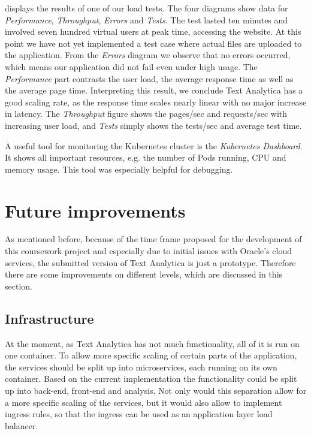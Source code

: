 \documentclass[conference]{IEEEtran}
\begin{document}
 displays the results of one of our load tests. The four diagrams show data for \textit{Performance}, \textit{Throughput}, \textit{Errors} and \textit{Tests}. The test lasted ten minutes and involved seven hundred virtual users at peak time, accessing the website. At this point we have not yet implemented a test case where actual files are uploaded to the application. From the \textit{Errors} diagram we observe that no errors occurred, which means our application did not fail even under high usage. The \textit{Performance} part contrasts the user load, the average response time as well as the average page time. Interpreting this result, we conclude Text Analytica has a good scaling rate, as the response time scales nearly linear with no major increase in latency. The \textit{Throughput} figure shows the pages/sec and requests/sec with increasing user load, and \textit{Tests} simply shows the tests/sec and average test time.

A useful tool for monitoring the Kubernetes cluster is the \textit{Kubernetes Dashboard}. It shows all important resources, e.g. the number of Pods running, CPU and memory usage. This tool was especially helpful for debugging.

\section{Future improvements}
\label{sec:future-improvements}
As mentioned before, because of the time frame proposed for the development of this coursework project and especially due to initial issues with Oracle's cloud services, the submitted version of Text Analytica is just a prototype. Therefore there are some improvements on different levels, which are discussed in this section.

\subsection{Infrastructure}
At the moment, as Text Analytica has not much functionality, all of it is run on one container. To allow more specific scaling of certain parts of the application, the services should be split up into microservices, each running on its own container. Based on the current implementation the functionality could be split up into back-end, front-end and analysis. Not only would this separation allow for a more specific scaling of the services, but it would also allow to implement ingress rules, so that the ingress can be used as an application layer load balancer.
\end{document}
